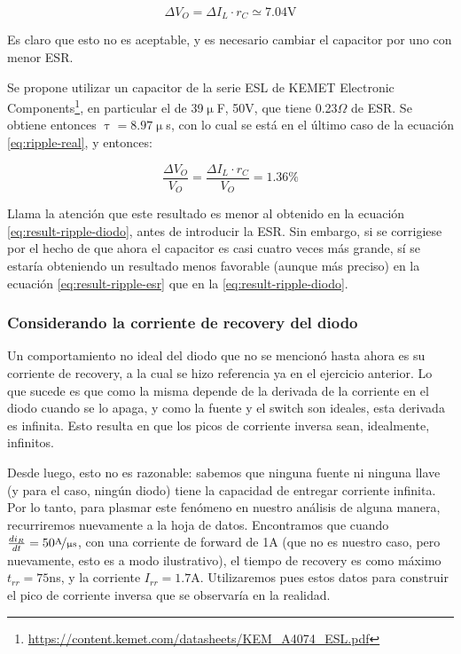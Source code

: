 \documentclass[e4_tp1_main.tex]{subfiles}
\begin{document}
\begin{equation}
	\Delta V_O =	\Delta I_L \cdot r_C \simeq 7.04\text{V}
	\label{eq:ripple-real}
\end{equation}

Es claro que esto no es aceptable, y es necesario cambiar el capacitor por uno con menor ESR.

Se propone utilizar un capacitor de la serie ESL de KEMET Electronic Components\footnote{
	\url{https://content.kemet.com/datasheets/KEM_A4074_ESL.pdf}
}, en particular el de 39$\upmu$F, 50V, que tiene 0.23$\Omega$ de ESR. Se obtiene entonces $\uptau = 8.97 \upmu$s, con lo cual se est\'a en el \'ultimo caso de la ecuaci\'on \ref{eq:ripple-real}, y entonces:

\begin{equation}
	\frac{\Delta V_O}{V_O} = \frac{\Delta I_L \cdot r_C}{V_O} = 1.36 \%
	\label{eq:result-ripple-esr}
\end{equation}

Llama la atenci\'on que este resultado es menor al obtenido en la ecuaci\'on \ref{eq:result-ripple-diodo}, antes de introducir la ESR. Sin embargo, si se corrigiese por el hecho de que ahora el capacitor es casi cuatro veces m\'as grande, s\'i se estar\'ia obteniendo un resultado menos favorable (aunque m\'as preciso) en la ecuaci\'on \ref{eq:result-ripple-esr} que en la  \ref{eq:result-ripple-diodo}.


\subsubsection{Considerando la corriente de recovery del diodo}

Un comportamiento no ideal del diodo que no se mencion\'o hasta ahora es su corriente de recovery, a la cual se hizo referencia ya en el ejercicio anterior. Lo que sucede es que como la misma depende de la derivada de la corriente en el diodo cuando se lo apaga, y como la fuente y el switch son ideales, esta derivada es infinita. Esto resulta en que los picos de corriente inversa sean, idealmente, infinitos.

Desde luego, esto no es razonable: sabemos que ninguna fuente ni ninguna llave (y para el caso, ning\'un diodo) tiene la capacidad de entregar corriente infinita. Por lo tanto, para plasmar este fen\'omeno  en nuestro an\'alisis de alguna manera, recurriremos nuevamente a la hoja de datos. Encontramos que cuando $\frac{di_R}{dt} = 50\nicefrac{\text{A}}{\upmu \text{s}}$, con una corriente de forward de 1A (que no es nuestro caso, pero nuevamente, esto es a modo ilustrativo), el tiempo de recovery es como m\'aximo $t_{rr}=75$ns, y la corriente $I_{rr} = 1.7$A. Utilizaremos pues estos datos para construir el pico de corriente inversa que se observar\'ia en la realidad.
\end{document}
